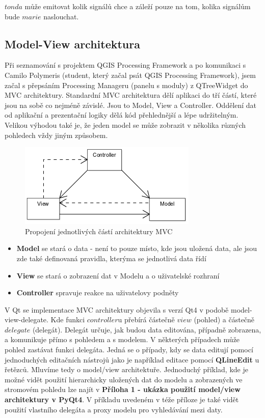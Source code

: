 \noindent $tonda$ může emitovat kolik signálů chce a záleží pouze na tom, kolika signálům bude $marie$ naslouchat.

\subsection{Model-View architektura}
Při seznamování s projektem QGIS Processing Framework a po komunikaci s Camilo Polymeris (student, který začal psát QGIS Processing Framework), jsem začal s přepsáním Processing Manageru (panelu s moduly) z QTreeWidget do MVC architektury. Standardní MVC architektura dělí aplikaci do tří částí, které jsou na sobě co nejméně závislé. Jsou to Model, View a Controller. Oddělení dat od aplikační a prezentační logiky dělá kód přehlednější a lépe udržitelným. Velikou výhodou také je, že jeden model se může zobrazit v několika různých pohledech vždy jiným způsobem.

\begin{figure}[h]
	\centering
	\includegraphics[scale=0.7]{pictures/qt/mvc}
	\caption{Propojení jednotlivých částí architektury MVC}
	\label{mvc}
\end{figure}

\begin{itemize}
	\item{\textbf{Model}} se stará o data - není to pouze místo, kde jsou uložená data, ale jsou zde také definovaná pravidla, kterýma se jednotlivá data řídí
	\item{\textbf{View}} se stará o zobrazení dat v Modelu a o uživatelské rozhraní
	\item{\textbf{Controller}} spravuje reakce na uživatelovy podněty %
\end{itemize}

V Qt se implementace MVC architektury objevila s verzí Qt4 v podobě model-view-delegate. Kde funkci $controller$u přebírá částečně $view$ (pohled) a částečně $delegate$ (delegát). Delegát určuje, jak budou data editována, případně zobrazena, a komunikuje přímo s pohledem a s modelem. V některých případech může pohled zastávat funkci delegáta. Jedná se o případy, kdy se data editují pomocí jednoduchých editačních nástrojů jako je například editace pomocí \textbf{QLineEdit} u řetězců. Mluvíme tedy o model/view architektuře. Jednoduchý příklad, kde je možné vidět použití hierarchicky uložených dat do modelu a zobrazených ve stromovém pohledu lze najít v \textbf{Příloha 1 - ukázka použití model/view architektury v PyQt4}. V příkladu uvedeném v téže příloze je také vidět použití vlastního delegáta a proxy modelu pro vyhledávání mezi daty.

